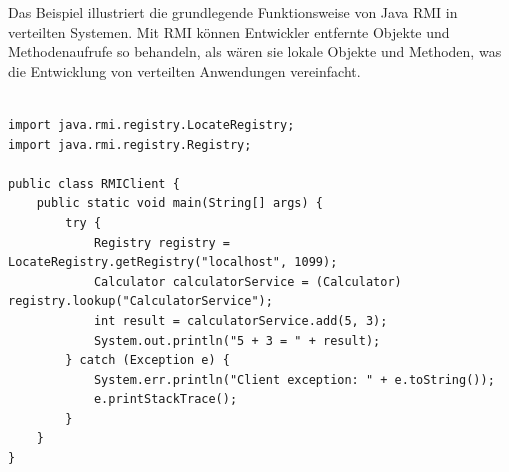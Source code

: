 \documentclass[../vs-script-first-v01.tex]{subfiles}
\begin{document}
Das Beispiel illustriert die grundlegende Funktionsweise von Java RMI in verteilten Systemen. Mit RMI können Entwickler entfernte Objekte und Methodenaufrufe so behandeln, als wären sie lokale Objekte und Methoden, was die Entwicklung von verteilten Anwendungen vereinfacht.\\\\
\noindent\begin{minipage}{\textwidth}
\begin{lstlisting}[caption={ RMI-Client (RMIClient.java)},captionpos=b,label={lst:rmi-serverIV}]
import java.rmi.registry.LocateRegistry;
import java.rmi.registry.Registry;

public class RMIClient {
    public static void main(String[] args) {
        try {
            Registry registry = LocateRegistry.getRegistry("localhost", 1099);
            Calculator calculatorService = (Calculator) registry.lookup("CalculatorService");
            int result = calculatorService.add(5, 3);
            System.out.println("5 + 3 = " + result);
        } catch (Exception e) {
            System.err.println("Client exception: " + e.toString());
            e.printStackTrace();
        }
    }
}
\end{lstlisting}
\end{minipage}
\end{document}
